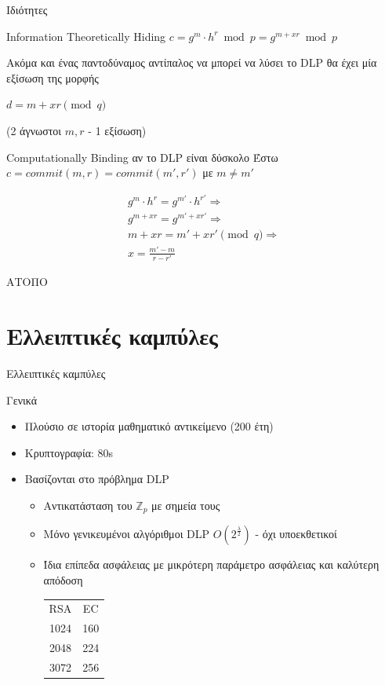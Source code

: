 \documentclass[handout]{beamer}
\begin{document}
\begin{frame}[allowframebreaks]{Ιδιότητες}
\begin{block}{Information Theoretically Hiding}
$c = g^m \cdot h^r \bmod{p}=g^{m+xr} \bmod{p}$

Ακόμα και ένας παντοδύναμος αντίπαλος να μπορεί να λύσει το DLP θα έχει μία εξίσωση της μορφής

$d = m+xr \pmod{q}$ 

(2 άγνωστοι $m,r$ - 1 εξίσωση)
\end{block}

\framebreak

\begin{block}{Computationally Binding αν το DLP είναι δύσκολο}
Έστω $c=commit(m,r)=commit(m',r')$ με $m \neq m'$

\begin{align*}
g^m \cdot h^r = g^{m'} \cdot h^{r'} \Rightarrow \\
g^{m+xr} = g^{m' + xr'} \Rightarrow \\
m+xr=m'+xr' \pmod{q} \Rightarrow \\
x = \frac{m'-m}{r-r'}
\end{align*}

\alert{ΑΤΟΠΟ}
\end{block}
\end{frame}


\section{Ελλειπτικές καμπύλες}

\begin{frame}{Ελλειπτικές καμπύλες}
\begin{block}{Γενικά}
\begin{itemize}
\item Πλούσιο σε ιστορία μαθηματικό αντικείμενο (200 έτη) \pause
\item Κρυπτογραφία: 80s \pause
\item Βασίζονται στο πρόβλημα DLP \pause
\begin{itemize}
\item Αντικατάσταση του $\mathbb{Z}_{p}$ με σημεία τους \pause
\item Μόνο γενικευμένοι αλγόριθμοι DLP $O(2^\frac{\lambda}{2})$ - όχι υποεκθετικοί \pause
\item Ίδια επίπεδα ασφάλειας με μικρότερη παράμετρο ασφάλειας και καλύτερη απόδοση\\
\begin{tabular}{cc}
RSA & EC \\
1024 & 160 \\
2048 & 224 \\
3072 & 256 \\
\end{tabular}
\end{itemize}
\end{itemize}
\end{block}
\end{frame}
\end{document}
